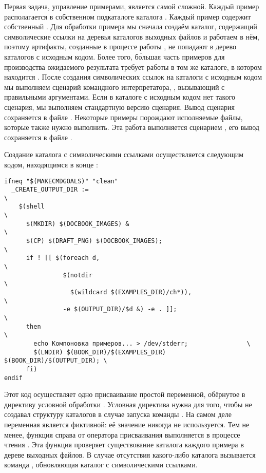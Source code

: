 Первая задача, управление примерами, является самой сложной. Каждый
пример располагается в собственном подкаталоге каталога
. Каждый пример содержит
собственный \Makefile{}. Для обработки примера мы сначала создаём
каталог, содержащий символические ссылки на деревья каталогов выходных
файлов и работаем в нём, поэтому артифакты, созданные в процессе
работы \GNUmake{}, не попадают в дерево каталогов с исходным
кодом. Более того, б\'{о}льшая часть примеров для производства
ожидаемого результата требует работы в том же каталоге, в котором
находится \Makefile{}. После создания символических ссылок на каталоги
с исходным кодом мы выполняем сценарий командного интерпретатора,
, вызывающий \Makefile{} с правильными
аргументами. Если в каталоге с исходным кодом нет такого сценария, мы
выполняем стандартную версию сценария. Вывод сценария
 сохраняется в файле . Некоторые
примеры порождают исполняемые файлы, которые также нужно
выполнить. Эта работа выполняется сценарием , его
вывод сохраняется в файле .

Создание каталога с символическими ссылками осуществляется следующим
кодом, находящимся в конце :

\begin{verbatim}
ifneq "$(MAKECMDGOALS)" "clean"
  _CREATE_OUTPUT_DIR :=                                                 \
    $(shell                                                             \
      $(MKDIR) $(DOCBOOK_IMAGES) &                                      \
      $(CP) $(DRAFT_PNG) $(DOCBOOK_IMAGES);                             \
      if ! [[ $(foreach d,                                              \
                $(notdir                                                \
                  $(wildcard $(EXAMPLES_DIR)/ch*)),                     \
                -e $(OUTPUT_DIR)/$d &) -e . ]];                         \
      then                                                              \
        echo Компоновка примеров... > /dev/stderr;                \
        $(LNDIR) $(BOOK_DIR)/$(EXAMPLES_DIR) $(BOOK_DIR)/$(OUTPUT_DIR); \
      fi)
endif
\end{verbatim}

Этот код осуществляет одно присваивание простой переменной, обёрнутое
в директиву условной обработки \directive{ifneq}. Условная директива
нужна для того, чтобы \GNUmake{} не создавал структуру каталогов в
случае запуска команды \command{make clean}. На самом деле переменная
является фиктивной: её значение никогда не используется. Тем не менее,
функция \function{shell} справа от оператора присваивания выполняется
в процессе чтения \makefile{а}. Эта функция проверяет существование
каталога каждого примера в дереве выходных файлов. В случае отсутствия
какого-либо каталога вызывается команда , обновляющая
каталог с символическими ссылками.


